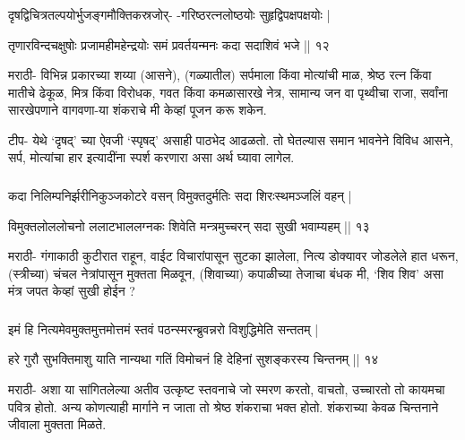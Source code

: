 \begin{frame}[fragile]\frametitle{}

दृषद्विचित्रतल्पयोर्भुजङ्गमौक्तिकस्रजोर्- -गरिष्ठरत्नलोष्ठयोः सुहृद्विपक्षपक्षयोः | 

तृणारविन्दचक्षुषोः प्रजामहीमहेन्द्रयोः समं प्रवर्तयन्मनः कदा सदाशिवं भजे || १२



 मराठी- विभिन्न प्रकारच्या शय्या (आसने), (गळ्यातील) सर्पमाला किंवा मोत्यांची माळ, श्रेष्ठ रत्न किंवा मातीचे ढेकूळ, मित्र किंवा विरोधक, गवत किंवा कमळासारखे नेत्र, सामान्य जन वा पृथ्वीचा राजा, सर्वांना सारखेपणाने वागवणा-या शंकराचे मी केव्हां पूजन करू शकेन. 
 

 टीप- येथे ‘दृषद्’ च्या ऐवजी ‘स्पृषद्’ असाही पाठभेद आढळतो. तो घेतल्यास समान भावनेने विविध आसने, सर्प, मोत्यांचा हार इत्यादींना स्पर्श करणारा असा अर्थ घ्यावा लागेल. 
\end{frame}

\begin{frame}[fragile]\frametitle{}

 कदा निलिम्पनिर्झरीनिकुञ्जकोटरे वसन् विमुक्तदुर्मतिः सदा शिरःस्थमञ्जलिं वहन् |

 
 विमुक्तलोललोचनो ललाटभाललग्नकः शिवेति मन्त्रमुच्चरन् सदा सुखी भवाम्यहम् || १३ 
 
 
 मराठी- गंगाकाठी कुटीरात राहून, वाईट विचारांपासून सुटका झालेला, नित्य डोक्यावर जोडलेले हात धरून, (स्त्रीच्या) चंचल नेत्रांपासून मुक्तता मिळवून, (शिवाच्या) कपाळीच्या तेजाचा बंधक मी, ‘शिव शिव’ असा मंत्र जपत केव्हां सुखी होईन ?
\end{frame}

\begin{frame}[fragile]\frametitle{}
 
 इमं हि नित्यमेवमुक्तमुत्तमोत्तमं स्तवं पठन्स्मरन्ब्रुवन्नरो विशुद्धिमेति सन्ततम् | 
 
 
 हरे गुरौ सुभक्तिमाशु याति नान्यथा गतिं विमोचनं हि देहिनां सुशङ्करस्य चिन्तनम् || १४ 
 
 
 मराठी- अशा या सांगितलेल्या अतीव उत्कृष्ट स्तवनाचे जो स्मरण करतो, वाचतो, उच्चारतो तो कायमचा पवित्र होतो. अन्य कोणत्याही मार्गाने न जाता तो श्रेष्ठ शंकराचा भक्त होतो. शंकराच्या केवळ चिन्तनाने जीवाला मुक्तता मिळते. 
\end{frame}

 
